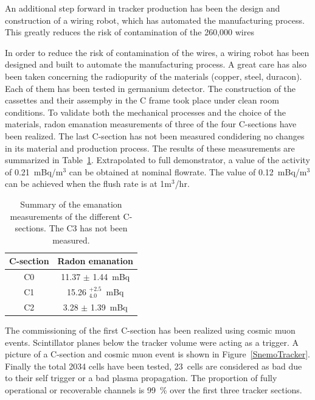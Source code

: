 \documentclass[main.tex]{subfiles}
\begin{document}
\bigskip


An additional step forward in tracker production has been the design and construction
of a wiring robot, which has automated the manufacturing process. This greatly
reduces the risk of contamination of the 260,000 wires


\NI In order to reduce the risk of contamination of the wires, a wiring robot has been designed and built to automate the manufacturing process. A great care has also been taken concerning the radiopurity of the materials (copper, steel, duracon). Each of them has been tested in germanium detector. The construction of the cassettes and their assempby in the C frame took place under clean room conditions. To validate both the mechanical processes and the choice of the materials, radon emanation measurements of three of the four C-sections have been realized. The last C-section has not been measured condidering no changes in its material and production process. The results of these measurements are summarized in Table~\ref{tab:RadonEmanation}. Extrapolated to full demonstrator, a value of the activity of 0.21~mBq/m$^{\text{3}}$ can be obtained at nominal flowrate. The value of 0.12~mBq/m$^{\text{3}}$ can be achieved when the flush rate is at 1m$^{\text{3}}$/hr.


\begin{table}[h!]
\centering
\begin{tabular}{c|c}
\toprule
C-section & Radon emanation \\
\hline	
C0 & 11.37 $\pm$ 1.44~mBq \\
C1 & 15.26 $^{+\text{2.5}}_{\text{4.0}}$~mBq \\
C2 & 3.28 $\pm$ 1.39~mBq \\
\bottomrule
\end{tabular}
\caption{Summary of the emanation measurements of the different C-sections. The C3 has not been measured.}
\label{tab:RadonEmanation}
\end{table}


\bigskip


\NI The commissioning of the first C-section has been realized using cosmic muon events. Scintillator planes below the tracker volume were acting as a trigger. A picture of a C-section and cosmic muon event is shown in Figure~\ref{SnemoTracker}. Finally the total 2034 cells have been tested, 23~cells are considered as bad due to their self trigger or a bad plasma propagation. The proportion of fully operational or recoverable channels is 99~\% over the first three tracker sections. 
\end{document}
